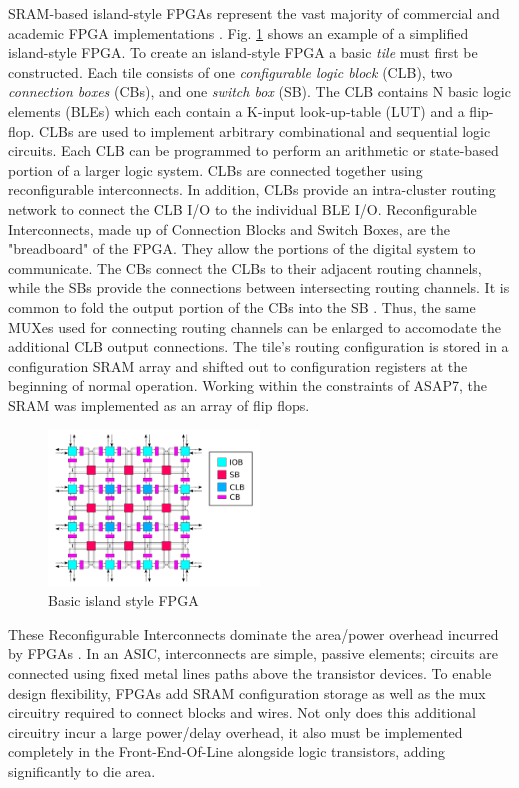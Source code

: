 \documentclass[twoside,twocolumn]{article}
\begin{document}
SRAM-based island-style FPGAs represent the vast majority of commercial and academic
FPGA implementations \cite{farooq_fpga_2012}. Fig. \ref{fig:island} shows an example of a simplified island-style FPGA. 
To create an island-style FPGA a basic \textit{tile} must first be constructed. Each tile consists of one 
\textit{configurable logic block} (CLB), two \textit{connection boxes} (CBs), and one \textit{switch box} (SB). 
The CLB contains N basic logic elements (BLEs) which each contain a K-input look-up-table (LUT) and a flip-flop. 
CLBs are used to implement arbitrary combinational and sequential logic circuits. 
Each CLB can be programmed to perform an arithmetic or state-based portion of a larger logic system. CLBs are connected together using reconfigurable interconnects. In addition, CLBs provide an intra-cluster routing network to connect the CLB I/O to the individual BLE I/O. Reconfigurable Interconnects, made up of Connection Blocks and Switch Boxes, are the "breadboard" of the FPGA. They allow the portions of the digital system to communicate. The CBs connect the CLBs to their adjacent routing channels, while the SBs provide the connections
between intersecting routing channels. It is common to fold the output portion of 
the CBs into the SB \cite{chen_efficient_2010}. Thus, the same MUXes used for
connecting routing channels can be enlarged to accomodate the additional 
CLB output connections. The tile's routing configuration is stored in a configuration SRAM array
and shifted out to configuration registers at the beginning of normal operation. Working within
the constraints of ASAP7, the SRAM was implemented as an array of flip flops.

\begin{figure}[!hbt]
    \centering
    \includegraphics[width=0.5\textwidth]{figs/island_style.png}
    \caption{Basic island style FPGA}
    \label{fig:island}    
\end{figure}

These Reconfigurable Interconnects dominate the area/power overhead incurred by FPGAs \cite{ALTERA}. In an ASIC, interconnects are simple, passive elements; circuits are connected using fixed metal lines paths above the transistor devices. To enable design flexibility, FPGAs add SRAM configuration storage as well as the mux circuitry required to connect blocks and wires. Not only does this additional circuitry incur a large power/delay overhead, it also must be implemented completely in the Front-End-Of-Line alongside logic transistors, adding significantly to die area.
\end{document}
